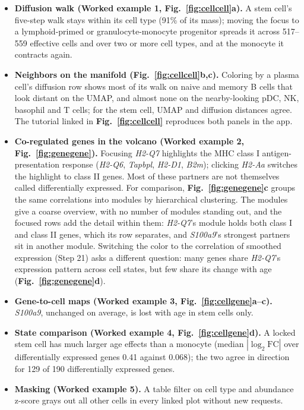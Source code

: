 \begin{itemize}[nosep]
\item \textbf{Diffusion walk (Worked example 1, \textbf{Fig.~\ref{fig:cellcell}a}).} A stem cell's five-step walk stays within its cell type (91\% of its mass); moving the focus to a lymphoid-primed or granulocyte-monocyte progenitor spreads it across 517--559 effective cells and over two or more cell types, and at the monocyte it contracts again.
\item \textbf{Neighbors on the manifold (\textbf{Fig.~\ref{fig:cellcell}b,c}).} Coloring by a plasma cell's diffusion row shows most of its walk on naive and memory B cells that look distant on the UMAP, and almost none on the nearby-looking pDC, NK, basophil and T cells; for the stem cell, UMAP and diffusion distances agree. The tutorial linked in \textbf{Fig.~\ref{fig:cellcell}} reproduces both panels in the app.
\item \textbf{Co-regulated genes in the volcano (Worked example 2, \textbf{Fig.~\ref{fig:genegene}}).} Focusing \textit{H2-Q7} highlights the MHC class I antigen-presentation response (\textit{H2-Q6}, \textit{Tapbpl}, \textit{H2-D1}, \textit{B2m}); clicking \textit{H2-Aa} switches the highlight to class II genes. Most of these partners are not themselves called differentially expressed. For comparison, \textbf{Fig.~\ref{fig:genegene}c} groups the same correlations into modules by hierarchical clustering. The modules give a coarse overview, with no number of modules standing out, and the focused rows add the detail within them: \textit{H2-Q7}'s module holds both class I and class II genes, which its row separates, and \textit{S100a9}'s strongest partners sit in another module. Switching the color to the correlation of smoothed expression (Step 21) asks a different question: many genes share \textit{H2-Q7}'s expression pattern across cell states, but few share its change with age (\textbf{Fig.~\ref{fig:genegene}d}).
\item \textbf{Gene-to-cell maps (Worked example 3, \textbf{Fig.~\ref{fig:cellgene}a--c}).} \textit{S100a9}, unchanged on average, is lost with age in stem cells only.
\item \textbf{State comparison (Worked example 4, \textbf{Fig.~\ref{fig:cellgene}d}).} A locked stem cell has much larger age effects than a monocyte (median $|\log_2 \mathrm{FC}|$ over differentially expressed genes 0.41 against 0.068); the two agree in direction for 129 of 190 differentially expressed genes.
\item \textbf{Masking (Worked example 5).} A table filter on cell type and abundance z-score grays out all other cells in every linked plot without new requests.
\end{itemize}

